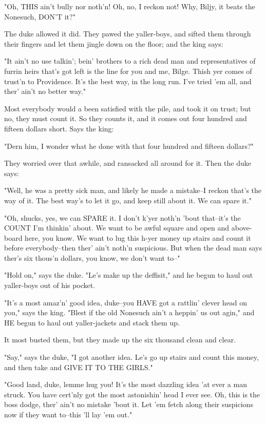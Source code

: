 "Oh, THIS ain't bully nor noth'n!  Oh, no, I reckon not!  Why, Biljy, it
beats the Nonesuch, DON'T it?"

The duke allowed it did.  They pawed the yaller-boys, and sifted them
through their fingers and let them jingle down on the floor; and the king
says:

"It ain't no use talkin'; bein' brothers to a rich dead man and
representatives of furrin heirs that's got left is the line for you and
me, Bilge.  Thish yer comes of trust'n to Providence.  It's the best way,
in the long run.  I've tried 'em all, and ther' ain't no better way."

Most everybody would a been satisfied with the pile, and took it on
trust; but no, they must count it.  So they counts it, and it comes out
four hundred and fifteen dollars short.  Says the king:

"Dern him, I wonder what he done with that four hundred and fifteen
dollars?"

They worried over that awhile, and ransacked all around for it.  Then the
duke says:

"Well, he was a pretty sick man, and likely he made a mistake--I reckon
that's the way of it.  The best way's to let it go, and keep still about
it.  We can spare it."

"Oh, shucks, yes, we can SPARE it.  I don't k'yer noth'n 'bout that--it's
the COUNT I'm thinkin' about.  We want to be awful square and open and
above-board here, you know.  We want to lug this h-yer money up stairs
and count it before everybody--then ther' ain't noth'n suspicious.  But
when the dead man says ther's six thous'n dollars, you know, we don't
want to--"

"Hold on," says the duke.  "Le's make up the deffisit," and he begun to
haul out yaller-boys out of his pocket.

"It's a most amaz'n' good idea, duke--you HAVE got a rattlin' clever head
on you," says the king.  "Blest if the old Nonesuch ain't a heppin' us
out agin," and HE begun to haul out yaller-jackets and stack them up.

It most busted them, but they made up the six thousand clean and clear.

"Say," says the duke, "I got another idea.  Le's go up stairs and count
this money, and then take and GIVE IT TO THE GIRLS."

"Good land, duke, lemme hug you!  It's the most dazzling idea 'at ever a
man struck.  You have cert'nly got the most astonishin' head I ever see.
Oh, this is the boss dodge, ther' ain't no mistake 'bout it.  Let 'em
fetch along their suspicions now if they want to--this 'll lay 'em out."

